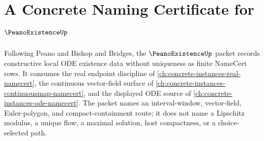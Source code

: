 \chapter{A Concrete Naming Certificate for $\PeanoExistenceUp$}
\label{ch:concrete-instances-peano-existence-namecert}

Following Peano and Bishop and Bridges, the $\PeanoExistenceUp$ packet records constructive local ODE existence data without uniqueness as finite NameCert rows. It consumes the real endpoint discipline of \autoref{ch:concrete-instances-real-namecert}, the continuous vector-field surface of \autoref{ch:concrete-instances-continuousmap-namecert}, and the displayed ODE source of \autoref{ch:concrete-instances-ode-namecert}. The packet names an interval-window, vector-field, Euler-polygon, and compact-containment route; it does not name a Lipschitz modulus, a unique flow, a maximal solution, host compactness, or a choice-selected path.

